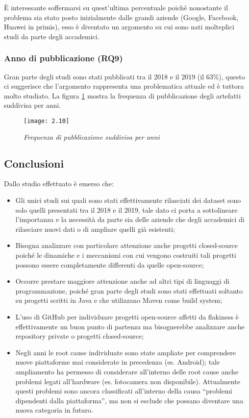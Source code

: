 È interessante soffermarsi su quest’ultima percentuale poiché nonostante il problema sia stato posto inizialmente dalle grandi aziende (Google, Facebook, Huawei in primis), esso è diventato un argomento su cui sono nati molteplici studi da parte degli accademici.
\subsubsection{Anno di pubblicazione (RQ9)}
Gran parte degli studi sono stati pubblicati tra il 2018 e il 2019 (il 63\%), questo ci suggerisce che l’argomento rappresenta una problematica attuale ed è tuttora molto studiato.
La figura \ref{fig:fig.2.10} mostra la frequenza di pubblicazione degli artefatti suddivisa per anni.
\newpage
\begin{figure}[h]
	\centering
	\texttt{[image: 2.10]}
	\caption{\emph{Frequenza di pubblicazione suddivisa per anni}}
	\label{fig:fig.2.10}
\end{figure}
\subsection{Conclusioni}
	Dallo studio effettuato è emerso che:
\begin{itemize}

	\item  Gli unici studi sui quali sono stati effettivamente rilasciati dei dataset sono
	solo quelli presentati tra il 2018 e il 2019, tale dato ci porta a sottolineare l’importanza e la necessità da parte sia delle aziende che degli accademici
	di rilasciare nuovi dati o di ampliare quelli già esistenti;
	\item Bisogna analizzare con particolare attenzione anche progetti closed-source
	poiché le dinamiche e i meccanismi con cui vengono costruiti tali progetti possono essere completamente differenti da quelle open-source;
	\item Occorre prestare maggiore attenzione anche ad altri tipi di linguaggi di programmazione, poiché gran parte degli studi sono stati effettuati soltanto
	su progetti scritti in Java e che utilizzano Maven come build system;
	\item  L’uso di GitHub per individuare progetti open-source affetti da flakiness è effettivamente un buon punto di partenza ma bisognerebbe analizzare anche
	repository private o progetti closed-source;
	\item  Negli anni le root cause individuate sono state ampliate per comprendere nuove piattaforme mai considerate in precedenza (es. Android); tale
	ampliamento ha permesso di considerare all’interno delle root cause anche problemi legati all’hardware (es. fotocamera non disponibile). Attualmente questi problemi sono ancora classificati all’interno della causa “problemi
	dipendenti dalla piattaforma”, ma non si esclude che possano diventare una nuova categoria in futuro.
\end{itemize}
